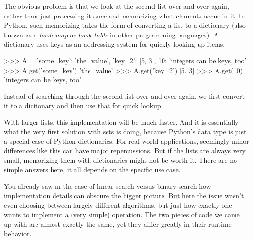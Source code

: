 The obvious problem is that we look at the second list over and over again, rather than just processing it once and memorizing what elements occur in it.
In Python, such memorizing takes the form of converting a list to a dictionary (also known as a \emph{hash map} or \emph{hash table} in other programming languages).
A dictionary uses keys as an addressing system for quickly looking up items.
%
\begin{center}
    \begin{pythoncode}
    >>> A = {'some_key': 'the_value', 'key_2': [5, 3],
             10: 'integers can be keys, too'}
    >>> A.get('some_key')
    'the_value'
    >>> A.get('key_2')
    [5, 3]
    >>> A.get(10)
    'integers can be keys, too'
    \end{pythoncode}
\end{center}
%
Instead of searching through the second list over and over again, we first convert it to a dictionary and then use that for quick lookup.

\begin{center}
\end{center}

With larger lists, this implementation will be much faster.
And it is essentially what the very first solution with sets is doing, because Python's  data type is just a special case of Python dictionaries.
For real-world applications, seemingly minor differences like this can have major repercussions.
But if the lists are always very small, memorizing them with dictionaries might not be worth it.
There are no simple answers here, it all depends on the specific use case.

You already saw in the case of linear search versus binary search how implementation details can obscure the bigger picture.
But here the issue wasn't even choosing between largely different algorithms, but just how exactly one wants to implement a (very simple) operation.
The two pieces of code we came up with are almost exactly the same, yet they differ greatly in their runtime behavior.



